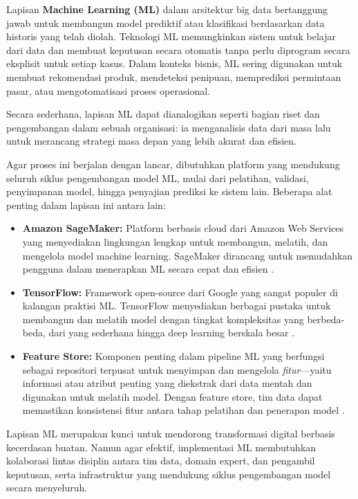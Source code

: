 Lapisan \textbf{Machine Learning (ML)} dalam arsitektur big data bertanggung jawab untuk membangun model prediktif atau klasifikasi berdasarkan data historis yang telah diolah. Teknologi ML memungkinkan sistem untuk belajar dari data dan membuat keputusan secara otomatis tanpa perlu diprogram secara eksplisit untuk setiap kasus. Dalam konteks bisnis, ML sering digunakan untuk membuat rekomendasi produk, mendeteksi penipuan, memprediksi permintaan pasar, atau mengotomatisasi proses operasional.

Secara sederhana, lapisan ML dapat dianalogikan seperti bagian riset dan pengembangan dalam sebuah organisasi: ia menganalisis data dari masa lalu untuk merancang strategi masa depan yang lebih akurat dan efisien.

Agar proses ini berjalan dengan lancar, dibutuhkan platform yang mendukung seluruh siklus pengembangan model ML, mulai dari pelatihan, validasi, penyimpanan model, hingga penyajian prediksi ke sistem lain. Beberapa alat penting dalam lapisan ini antara lain:

\begin{itemize}
	\item \textbf{Amazon SageMaker:} Platform berbasis cloud dari Amazon Web Services yang menyediakan lingkungan lengkap untuk membangun, melatih, dan mengelola model machine learning. SageMaker dirancang untuk memudahkan pengguna dalam menerapkan ML secara cepat dan efisien \cite{sagemaker2023}.
	
	\item \textbf{TensorFlow:} Framework open-source dari Google yang sangat populer di kalangan praktisi ML. TensorFlow menyediakan berbagai pustaka untuk membangun dan melatih model dengan tingkat kompleksitas yang berbeda-beda, dari yang sederhana hingga deep learning berskala besar \cite{tensorflow2023}.
	
	\item \textbf{Feature Store:} Komponen penting dalam pipeline ML yang berfungsi sebagai repositori terpusat untuk menyimpan dan mengelola \textit{fitur}—yaitu informasi atau atribut penting yang diekstrak dari data mentah dan digunakan untuk melatih model. Dengan feature store, tim data dapat memastikan konsistensi fitur antara tahap pelatihan dan penerapan model \cite{featurestore2021}.
\end{itemize}

Lapisan ML merupakan kunci untuk mendorong transformasi digital berbasis kecerdasan buatan. Namun agar efektif, implementasi ML membutuhkan kolaborasi lintas disiplin antara tim data, domain expert, dan pengambil keputusan, serta infrastruktur yang mendukung siklus pengembangan model secara menyeluruh.


